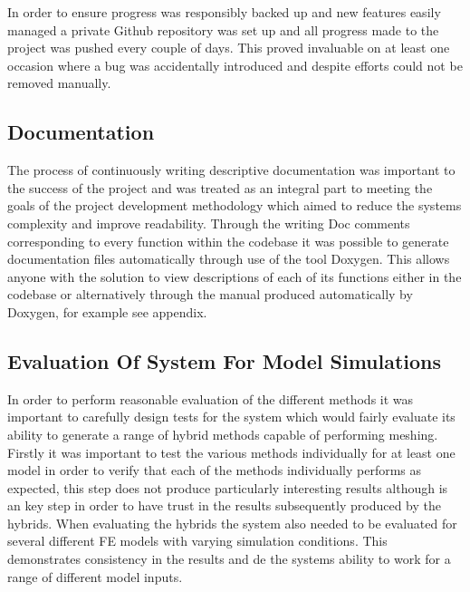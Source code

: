 \noindent
In order to ensure progress was responsibly backed up and new features easily managed a private Github repository was set up and all progress made to the project was pushed every couple of days. This proved invaluable on at least one occasion where a bug was accidentally introduced and despite efforts could not be removed manually. 


\subsection{Documentation}
The process of continuously writing descriptive documentation was important to the success of the project and was treated as an integral part to meeting the goals of the project development methodology which aimed to reduce the systems complexity and improve readability. Through the writing Doc comments corresponding to every function within the codebase it was possible to generate documentation files automatically through use of the tool Doxygen. This allows anyone with the solution to view descriptions of each of its functions either in the codebase or alternatively through the manual produced automatically by Doxygen, for example see appendix. \\ 

 

\subsection{Evaluation Of System For Model Simulations}


In order to perform reasonable evaluation of the different methods it was important to carefully design tests for the system which would fairly evaluate its ability to generate a range of hybrid methods capable of performing meshing. \\ 

\noindent
Firstly it was important to test the various methods individually for at least one model in order to verify that each of the methods individually performs as expected, this step does not produce particularly interesting results although is an key step in order to have trust in the results subsequently produced by the hybrids. When evaluating the hybrids the system also needed to be evaluated for several different FE models with varying simulation conditions. This demonstrates consistency in the results and de  the systems ability to work for a range of different model inputs. \\

